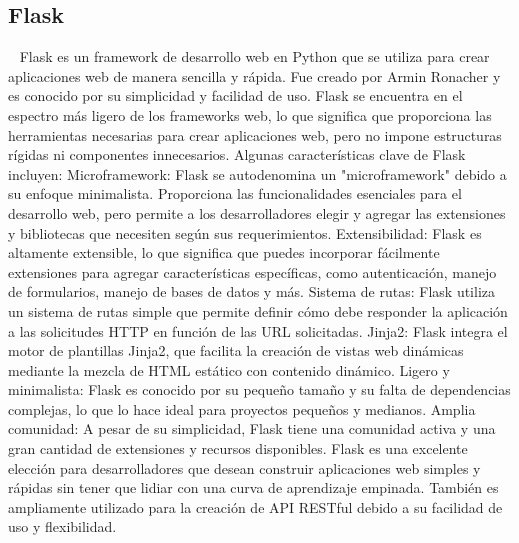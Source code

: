 \subsection{Flask}~\cite{dwyer2017flask}
Flask es un framework de desarrollo web en Python que se utiliza para crear aplicaciones web de manera sencilla y rápida. Fue creado por Armin Ronacher y es conocido por su simplicidad y facilidad de uso. Flask se encuentra en el espectro más ligero de los frameworks web, lo que significa que proporciona las herramientas necesarias para crear aplicaciones web, pero no impone estructuras rígidas ni componentes innecesarios.
Algunas características clave de Flask incluyen:
Microframework: Flask se autodenomina un "microframework" debido a su enfoque minimalista. Proporciona las funcionalidades esenciales para el desarrollo web, pero permite a los desarrolladores elegir y agregar las extensiones y bibliotecas que necesiten según sus requerimientos.
Extensibilidad: Flask es altamente extensible, lo que significa que puedes incorporar fácilmente extensiones para agregar características específicas, como autenticación, manejo de formularios, manejo de bases de datos y más.
Sistema de rutas: Flask utiliza un sistema de rutas simple que permite definir cómo debe responder la aplicación a las solicitudes HTTP en función de las URL solicitadas.
Jinja2: Flask integra el motor de plantillas Jinja2, que facilita la creación de vistas web dinámicas mediante la mezcla de HTML estático con contenido dinámico.
Ligero y minimalista: Flask es conocido por su pequeño tamaño y su falta de dependencias complejas, lo que lo hace ideal para proyectos pequeños y medianos.
Amplia comunidad: A pesar de su simplicidad, Flask tiene una comunidad activa y una gran cantidad de extensiones y recursos disponibles.
Flask es una excelente elección para desarrolladores que desean construir aplicaciones web simples y rápidas sin tener que lidiar con una curva de aprendizaje empinada. También es ampliamente utilizado para la creación de API RESTful debido a su facilidad de uso y flexibilidad.

